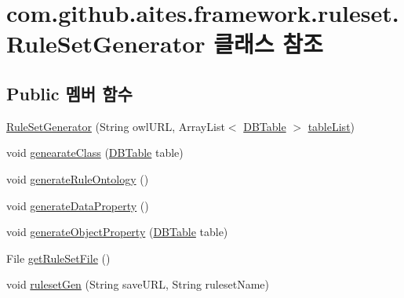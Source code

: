 \hypertarget{classcom_1_1github_1_1aites_1_1framework_1_1ruleset_1_1_rule_set_generator}{}\section{com.\+github.\+aites.\+framework.\+ruleset.\+Rule\+Set\+Generator 클래스 참조}
\label{classcom_1_1github_1_1aites_1_1framework_1_1ruleset_1_1_rule_set_generator}
\subsection*{Public 멤버 함수}
\begin{DoxyCompactItemize}
\item 
\mbox{\hyperlink{classcom_1_1github_1_1aites_1_1framework_1_1ruleset_1_1_rule_set_generator_a47f01931337f586154ce39fd412f1ed1}{Rule\+Set\+Generator}} (String owl\+U\+RL, Array\+List$<$ \mbox{\hyperlink{classcom_1_1github_1_1aites_1_1framework_1_1dbcomponent_1_1_d_b_table}{D\+B\+Table}} $>$ \mbox{\hyperlink{classcom_1_1github_1_1aites_1_1framework_1_1ruleset_1_1_rule_set_generator_ac7d8dddafc874c8c1d0bdedfec634d6d}{table\+List}})
\item 
void \mbox{\hyperlink{classcom_1_1github_1_1aites_1_1framework_1_1ruleset_1_1_rule_set_generator_ad0255e0849361313411b61576c1b9360}{genearate\+Class}} (\mbox{\hyperlink{classcom_1_1github_1_1aites_1_1framework_1_1dbcomponent_1_1_d_b_table}{D\+B\+Table}} table)
\item 
void \mbox{\hyperlink{classcom_1_1github_1_1aites_1_1framework_1_1ruleset_1_1_rule_set_generator_af33eca34b79f017e02f3304cd7a73b69}{generate\+Rule\+Ontology}} ()
\item 
void \mbox{\hyperlink{classcom_1_1github_1_1aites_1_1framework_1_1ruleset_1_1_rule_set_generator_a4296b42e9174f9a211a3844b5bc0c17b}{generate\+Data\+Property}} ()
\item 
void \mbox{\hyperlink{classcom_1_1github_1_1aites_1_1framework_1_1ruleset_1_1_rule_set_generator_a5bdcfcca00ceceed061f630962d19801}{generate\+Object\+Property}} (\mbox{\hyperlink{classcom_1_1github_1_1aites_1_1framework_1_1dbcomponent_1_1_d_b_table}{D\+B\+Table}} table)
\item 
File \mbox{\hyperlink{classcom_1_1github_1_1aites_1_1framework_1_1ruleset_1_1_rule_set_generator_a06d60cb8f5f3970e3741285c4a5cee23}{get\+Rule\+Set\+File}} ()
\item 
void \mbox{\hyperlink{classcom_1_1github_1_1aites_1_1framework_1_1ruleset_1_1_rule_set_generator_af42cba64a666571160bffc1832eff427}{ruleset\+Gen}} (String save\+U\+RL, String ruleset\+Name)
\end{DoxyCompactItemize}
